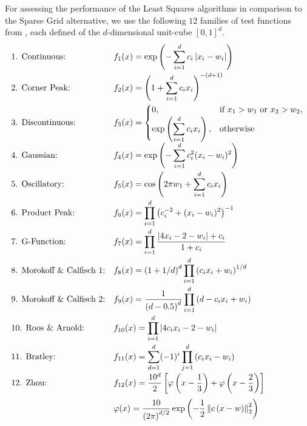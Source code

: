 \documentclass[12pt, oneside]{amsart}
\theoremstyle{definition}
\theoremstyle{remark}
\numberwithin{equation}{section}
\begin{document}
For assessing the performance of the Least Squares algorithms in comparison to 
the Sparse Grid alternative, we use the following $12$ families of test 
functions from \cite{Simulationlib_2013}, each defined of the $d$-dimensional 
unit-cube $[0,1]^d$.
\begin{align*}
	\begin{array}{l l}
		\text{1. Continuous:} & f_1(x) = \exp\left( - 
		\displaystyle\sum_{i=1}^{d} c_i \abs{x_i - w_i} \right) \\[12pt]
		\text{2. Corner Peak:} & f_2(x) = \left( 1 + 
		\displaystyle\sum_{i=1}^{d} c_i x_i 
		\right)^{-(d+1)} \\[12pt]
		\text{3. Discontinuous:} & f_3(x) = 
		\begin{cases}
			0, & \text{if } x_1 > w_1 \text{ or } x_2 > w_2, \\
			\exp\left( \displaystyle\sum_{i=1}^{d} c_i x_i \right), & 
			\text{otherwise}
		\end{cases} \\[12pt]
		\text{4. Gaussian:} & f_4(x) = \exp\left( - 
		\displaystyle\sum_{i=1}^{d} c_i^2 (x_i 
		- w_i)^2 \right) \\[12pt]
		\text{5. Oscillatory:} & f_5(x) = \cos\left( 2\pi w_1 + 
		\displaystyle\sum_{i=1}^{d} c_i x_i \right) \\[12pt]
		\text{6. Product Peak:} & f_6(x) = \displaystyle\prod_{i=1}^{d} 
		\left( c_i^{-2} + (x_i - w_i)^2 \right)^{-1} \\[12pt]
		\text{7. G-Function:} & f_7(x) = \displaystyle\prod_{i=1}^{d} 
		\frac{\abs{4x_i-2-w_i}+c_i}{1+c_i}
				\\[12pt]
		\text{8. Morokoff \& Calfisch 1:} & f_8(x) = 
		\displaystyle\left(1+1/d\right)^d  
		\prod_{i=1}^{d}\left(c_ix_i+w_i\right)^{1/d}
		\\[12pt]
		\text{9. Morokoff \& Calfisch 2:} & \displaystyle f_9(x) = 
		\frac{1}{\left(d-0.5\right)^d} 
		\prod_{i=1}^{d}\left(d-c_ix_i+w_i\right)
		\\[12pt]
		\text{10. Roos \& Arnold:} & f_{10}(x) = \displaystyle \prod_{i=1}^{d} 
		\abs{4c_ix_i-2-w_i}
		\\[12pt]
		\text{11. Bratley:} & f_{11}(x) = \displaystyle 
		\sum_{d=1}^{d}(-1)^{i}\prod_{j=1}^{d} \left(c_ix_i-w_i\right)
		\\[12pt]
		\text{12. Zhou:} & f_{12}(x) = \displaystyle \frac{10^d}{2} 
		\left[\phi\left(x-\frac13\right)+\phi\left(x-\frac23\right)\right] 
		\\[12pt]
		& \phi(x) = \displaystyle \frac{10}{\left(2\pi\right)^{d/2}} \exp 
		\left(-\frac{1}{2}\norm[2]{c\left(x-w\right)}^2\right)
	\end{array}
\end{align*}
\end{document}
